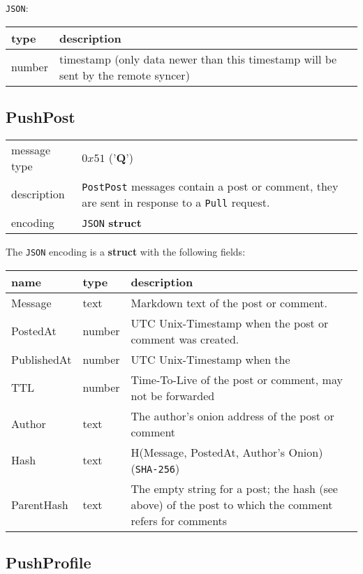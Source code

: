 \documentclass[12pt]{article}
\begin{document}
\texttt{JSON}:

\begin{tabular}{l p{}}
\hline
type & description \\\hline
number & timestamp (only data newer than this timestamp will be sent by the remote syncer) \\\hline
\end{tabular}

\subsection*{PushPost}

\begin{tabular}{l p{}}
\hline
message type & $0x51$ ('\textbf{Q}') \\
description & \texttt{PostPost} messages contain a post or comment, they are sent in response to a \texttt{Pull} request. \\
encoding & \texttt{JSON} \textbf{struct} \\\hline
\end{tabular}

The \texttt{JSON} encoding is a \textbf{struct} with the following fields:

\begin{tabular}{|l|l|p{}|}
\hline
name & type & description \\\hline\hline
Message     & text   & Markdown text of the post or comment. \\\hline
PostedAt    & number & UTC Unix-Timestamp when the post or comment was created. \\\hline
PublishedAt & number & UTC Unix-Timestamp when the \\\hline
TTL         & number & Time-To-Live of the post or comment, may not be forwarded  \\\hline
Author      & text   & The author's onion address of the post or comment \\\hline
Hash        & text   & H(Message, PostedAt, Author's Onion) (\texttt{SHA-256})\\\hline
ParentHash  & text   & The empty string for a post; the hash (see above) of the post to which the comment refers for comments\\\hline
\end{tabular}

\subsection*{PushProfile}
\end{document}
